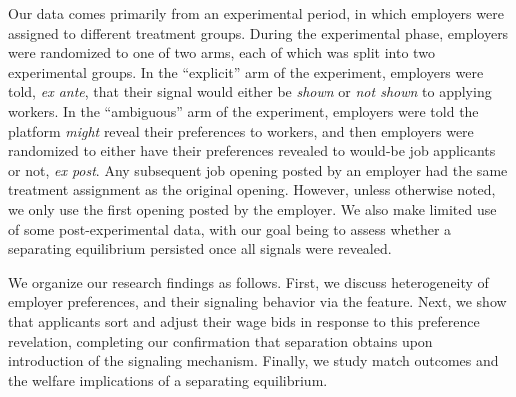 Our data comes primarily from an experimental period, in which employers were assigned to different treatment groups.
During the experimental phase, employers were randomized to one of two  arms,  each of which was split into two experimental groups. 
In the ``explicit'' arm of the experiment, employers were told, \emph{ex ante}, that their signal would either be \emph{shown} or \emph{not shown} to applying workers. 
In the ``ambiguous'' arm of the experiment, employers were told the platform \emph{might} reveal their preferences to workers, and then employers were randomized to either have their preferences revealed to would-be job applicants or not, \emph{ex post}.
Any subsequent job opening posted by an employer had the same treatment assignment as the original opening.
However, unless otherwise noted, we only use the first opening posted by the employer. 
We also make limited use of some post-experimental data, with our goal being to assess whether a separating equilibrium persisted once all signals were revealed. 

We organize our research findings as follows.  First, we discuss heterogeneity of employer preferences, and their signaling behavior via the feature.  Next, we show that applicants sort and adjust their wage bids in response to this preference revelation, completing our confirmation that separation obtains upon introduction of the signaling mechanism.  Finally, we study match outcomes and the welfare implications of a separating equilibrium.

